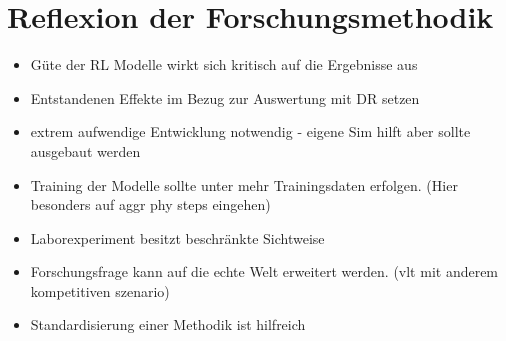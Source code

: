 \section{Reflexion der Forschungsmethodik}

\begin{itemize}
    \item Güte der RL Modelle wirkt sich kritisch auf die Ergebnisse aus
    \item Entstandenen Effekte im Bezug zur Auswertung mit DR setzen
    \item extrem aufwendige Entwicklung notwendig - eigene Sim hilft aber sollte ausgebaut werden
    \item Training der Modelle sollte unter mehr Trainingsdaten erfolgen. (Hier besonders auf aggr phy steps eingehen)
    \item Laborexperiment besitzt beschränkte Sichtweise
    \item Forschungsfrage kann auf die echte Welt erweitert werden. (vlt mit anderem kompetitiven szenario)
    \item Standardisierung einer Methodik ist hilfreich
\end{itemize}